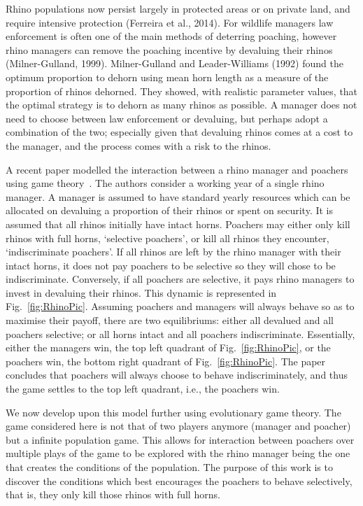 \documentclass[10pt]{article}
\begin{document}
Rhino populations now persist largely in protected areas or on private land, and
require intensive protection (Ferreira et al., 2014). For wildlife managers law 
enforcement is often one of the main methods of deterring poaching, however 
rhino managers can remove the poaching incentive by devaluing their rhinos 
(Milner-Gulland, 1999). Milner-Gulland and Leader-Williams (1992) found the 
optimum proportion to dehorn using mean horn length as a measure of the 
proportion of rhinos dehorned. They showed, with realistic parameter values, 
that the optimal strategy is to dehorn as many rhinos as possible. 
A manager does not need to choose between law enforcement or devaluing, but
perhaps adopt a combination of the two; especially given that devaluing rhinos 
comes at a cost to the manager, and the process comes with a risk to the rhinos.

A recent paper modelled the interaction between a rhino manager and poachers
using game theory~\cite{Lee}.  The authors consider a working year of a single 
rhino manager.  A manager is assumed to have standard yearly resources which
can be allocated on devaluing a proportion of their rhinos or spent on security. 
It is assumed that all rhinos initially have intact horns. Poachers may either only
kill rhinos with full horns, `selective poachers', or kill all rhinos they encounter, 
`indiscriminate poachers'. If all rhinos are left by the rhino manager with their 
intact horns, it does not pay poachers to be selective so they will chose to be 
indiscriminate. Conversely, if all poachers are selective, it pays rhino managers 
to invest in devaluing their rhinos. This dynamic is represented in Fig.~\ref{fig:RhinoPic}.
Assuming poachers and managers will always behave so as to maximise their 
payoff, there are two equilibriums: either all devalued and all poachers selective;
or all horns intact and all poachers indiscriminate. Essentially, either the managers 
win, the top left quadrant of Fig.~\ref{fig:RhinoPic}, or the poachers win, the bottom
right quadrant of Fig.~\ref{fig:RhinoPic}. The paper concludes that poachers will
always choose to behave indiscriminately, and thus the game settles to the top
left quadrant, i.e., the poachers win.

We now develop upon this model further using evolutionary game theory. The 
game considered here is not that of two players anymore (manager and poacher)
but a infinite population game. This allows for interaction between poachers over 
multiple plays of the game to be explored with the rhino manager being the one 
that creates the conditions of the population. The purpose of this work is to discover
the conditions which best encourages the poachers to behave selectively, that is,
they only kill those rhinos with full horns.
\end{document}
